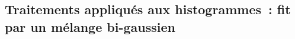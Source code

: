 \documentclass[main.tex]{subfiles}
\begin{document}
\subsection{Traitements appliqués aux histogrammes~: fit par un mélange bi-gaussien}
%
\end{document}
